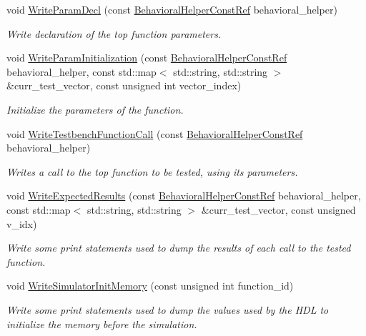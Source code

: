 \begin{DoxyCompactItemize}
void \hyperlink{classHLSCWriter_a7b7f749a967e9b84acd3488413a31c02}{Write\+Param\+Decl} (const \hyperlink{behavioral__helper_8hpp_aae973b54cac87eef3b27442aa3e1e425}{Behavioral\+Helper\+Const\+Ref} behavioral\+\_\+helper)
\begin{DoxyCompactList}\small\item\em Write declaration of the top function parameters. \end{DoxyCompactList}\item 
void \hyperlink{classHLSCWriter_ae9413ea7c35fc3eec7417fd0cf2a5b14}{Write\+Param\+Initialization} (const \hyperlink{behavioral__helper_8hpp_aae973b54cac87eef3b27442aa3e1e425}{Behavioral\+Helper\+Const\+Ref} behavioral\+\_\+helper, const std\+::map$<$ std\+::string, std\+::string $>$ \&curr\+\_\+test\+\_\+vector, const unsigned int vector\+\_\+index)
\begin{DoxyCompactList}\small\item\em Initialize the parameters of the function. \end{DoxyCompactList}\item 
void \hyperlink{classHLSCWriter_a65f826c5a0e6536a762985601e621250}{Write\+Testbench\+Function\+Call} (const \hyperlink{behavioral__helper_8hpp_aae973b54cac87eef3b27442aa3e1e425}{Behavioral\+Helper\+Const\+Ref} behavioral\+\_\+helper)
\begin{DoxyCompactList}\small\item\em Writes a call to the top function to be tested, using its parameters. \end{DoxyCompactList}\item 
void \hyperlink{classHLSCWriter_acc0cead1cb01ad8d36eb6a6ead0e034a}{Write\+Expected\+Results} (const \hyperlink{behavioral__helper_8hpp_aae973b54cac87eef3b27442aa3e1e425}{Behavioral\+Helper\+Const\+Ref} behavioral\+\_\+helper, const std\+::map$<$ std\+::string, std\+::string $>$ \&curr\+\_\+test\+\_\+vector, const unsigned v\+\_\+idx)
\begin{DoxyCompactList}\small\item\em Write some print statements used to dump the results of each call to the tested function. \end{DoxyCompactList}\item 
void \hyperlink{classHLSCWriter_ae0fce69eece5d49b74c5d615f169f17b}{Write\+Simulator\+Init\+Memory} (const unsigned int function\+\_\+id)
\begin{DoxyCompactList}\small\item\em Write some print statements used to dump the values used by the H\+DL to initialize the memory before the simulation. \end{DoxyCompactList}\item 

\end{DoxyCompactItemize}
